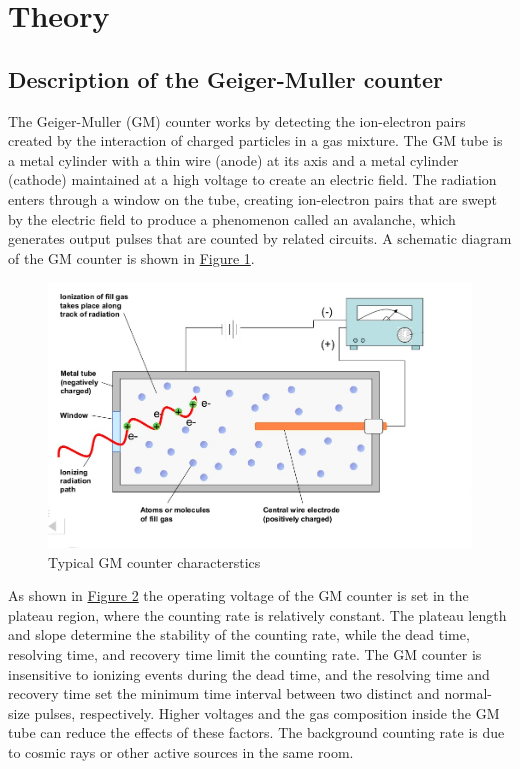 \section{Theory}
	\subsection{Description of the Geiger-Muller counter}
		The Geiger-Muller (GM) counter works by detecting the ion-electron pairs created by the interaction of charged particles in a gas mixture. The GM tube is a metal cylinder with a thin wire (anode) at its axis and a metal cylinder (cathode) maintained at a high voltage to create an electric field. The radiation enters through a window on the tube, creating ion-electron pairs that are swept by the electric field to produce a phenomenon called an avalanche, which generates output pulses that are counted by related circuits. A schematic diagram of the GM counter is shown in \hyperref[fig:th1]{Figure 1}.

		\begin{figure}[h]
			\centering
			\includegraphics[width=0.7\linewidth]{images/th2.png}
			\caption{Typical GM counter characterstics}
			\label{fig:th1}
		\end{figure}
		
		As shown in \hyperref[fig:th2]{Figure 2} the operating voltage of the GM counter is set in the plateau region, where the counting rate is relatively constant. The plateau length and slope determine the stability of the counting rate, while the dead time, resolving time, and recovery time limit the counting rate. The GM counter is insensitive to ionizing events during the dead time, and the resolving time and recovery time set the minimum time interval between two distinct and normal-size pulses, respectively. Higher voltages and the gas composition inside the GM tube can reduce the effects of these factors. The background counting rate is due to cosmic rays or other active sources in the same room.

